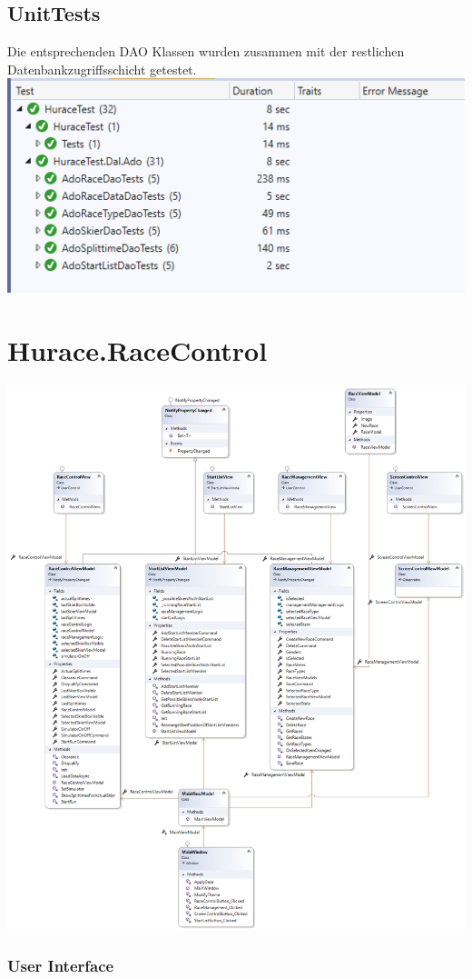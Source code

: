 \documentclass[a4paper, 12pt]{article}
\begin{document}
	\subsection{UnitTests}
	Die entsprechenden DAO Klassen wurden zusammen mit der restlichen Datenbankzugriffsschicht getestet. 
	\newline
	\newline
	\includegraphics[width=.7\textwidth]{img/UnitTests.png}
	
	\section{Hurace.RaceControl}
	\includegraphics[width=.9\textwidth]{img/RaceControl.png}
	\subsubsection{User Interface}
	
\end{document}

